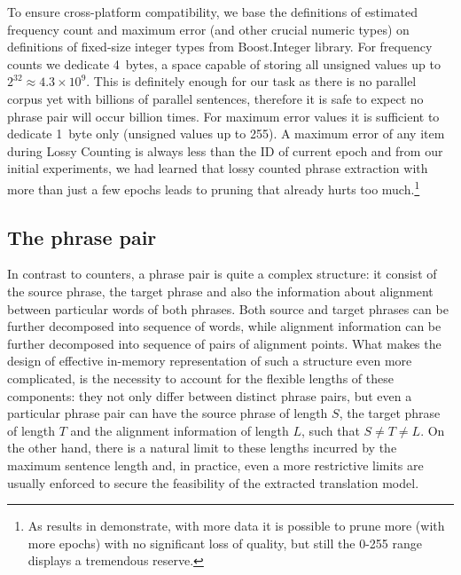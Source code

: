 To ensure cross-platform compatibility, we base the definitions of estimated frequency count and
maximum error (and other crucial numeric types) on definitions of fixed-size integer types from
Boost.Integer library.
For frequency counts we dedicate 4~bytes, a space capable of storing all unsigned values up to
$2^{32} \approx 4.3 \times 10^9$. This is definitely enough for our task as there is no
parallel corpus yet with billions of parallel sentences, therefore it is safe to expect no phrase
pair will occur billion times.
For maximum error values it is sufficient to dedicate 1~byte only (unsigned values up to 255).
A maximum error of any item during Lossy Counting is always less than the ID of current epoch and
from our initial experiments, we had learned that lossy counted phrase extraction with more than just
a few epochs leads to pruning that already hurts too much.\footnote{As results in 
demonstrate, with more data it is possible to prune more (with more epochs) with no significant
loss of quality, but still the 0-255 range displays a tremendous reserve.}

\subsection{The phrase pair}


In contrast to counters, a phrase pair is quite a complex structure: it consist of the source phrase,
the target phrase and also the information about alignment between particular words of both phrases.
Both source and target phrases can be further decomposed into sequence of words, while alignment
information can be further decomposed into sequence of pairs of alignment points.
What makes the design of effective in-memory representation of such a structure even more complicated,
is the necessity to account for the flexible lengths of these components: they not only differ between
distinct phrase pairs, but even a particular phrase pair can have the source phrase of length $S$,
the target phrase of length $T$ and the alignment information of length $L$, such that $S \neq T \neq L$.
On the other hand, there is a natural limit to these lengths incurred by the maximum sentence length and,
in practice, even a more restrictive limits are usually enforced to secure the feasibility of the
extracted translation model.

